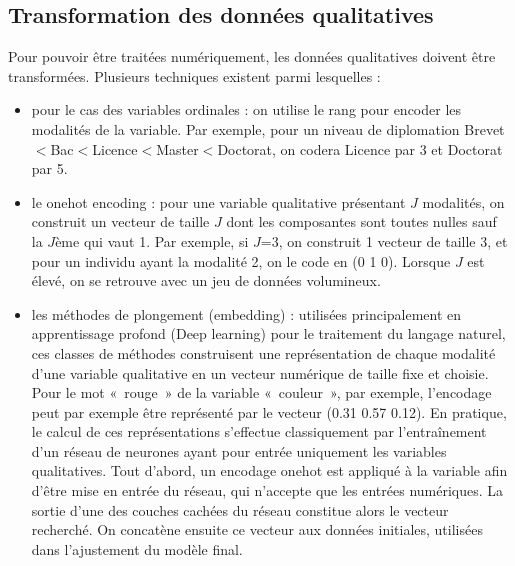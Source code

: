 \documentclass[letterpaper,10pt,french]{sphinxmanual}
\begin{document}
\subsection{Transformation des données qualitatives}
\label{\detokenize{statsdescriptives:transformation-des-donnees-qualitatives}}
\sphinxAtStartPar
Pour pouvoir être traitées numériquement, les données qualitatives doivent être transformées. Plusieurs techniques existent parmi lesquelles :
\begin{itemize}
\item {} 
\sphinxAtStartPar
pour le cas des variables ordinales : on utilise le rang pour encoder les modalités de la variable. Par exemple, pour un niveau de diplomation Brevet\(<\)Bac\(<\)Licence\(<\)Master\(<\)Doctorat, on codera Licence par 3 et Doctorat par 5.

\item {} 
\sphinxAtStartPar
le one\sphinxhyphen{}hot encoding : pour une variable qualitative présentant \(J\) modalités, on construit un vecteur de taille \(J\) dont les composantes sont toutes nulles sauf la \(J\)\sphinxhyphen{}ème qui vaut 1. Par exemple, si \(J\)=3, on construit 1 vecteur de taille 3, et pour un individu ayant la modalité 2, on le code en (0 1 0). Lorsque \(J\) est élevé, on se retrouve avec un jeu de données volumineux.

\item {} 
\sphinxAtStartPar
les méthodes de plongement (embedding) : utilisées principalement en apprentissage profond (Deep learning) pour le traitement du langage naturel, ces classes de méthodes construisent une représentation de chaque modalité d’une variable qualitative en un vecteur numérique de taille fixe et choisie. Pour le mot « rouge » de la variable « couleur », par exemple, l’encodage peut par exemple être représenté par le vecteur (0.31 0.57 0.12). En pratique, le calcul de ces représentations s’effectue classiquement par l’entraînement d’un réseau de neurones ayant pour entrée uniquement les variables qualitatives. Tout d’abord, un encodage one\sphinxhyphen{}hot est appliqué à la variable afin d’être mise en entrée du réseau, qui n’accepte que les entrées numériques. La sortie d’une des couches cachées du réseau constitue alors le vecteur recherché. On concatène ensuite ce vecteur aux données initiales, utilisées dans l’ajustement du modèle final.

\end{itemize}
\end{document}
